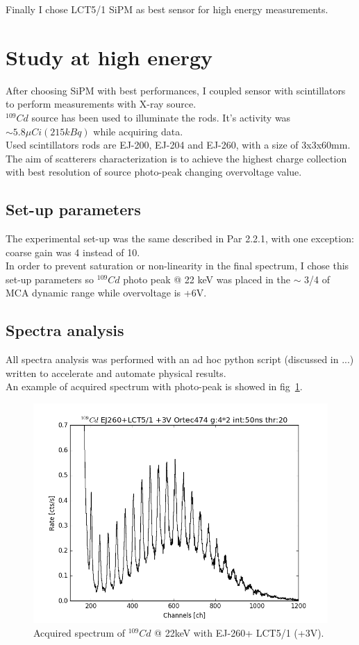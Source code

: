 \documentclass[10pt,a4paper, openany]{book}
\begin{document}
Finally I chose LCT5/1 SiPM as best sensor for high energy measurements.

\section{Study at high energy}
After choosing SiPM with best performances, I coupled sensor with scintillators to perform measurements with X-ray source.\\
$^{109}Cd$ source has been used to illuminate the rods. It's activity was $\sim 5.8 \mu Ci (215 kBq)$ while acquiring data.\\
Used scintillators rods are EJ-200, EJ-204 and EJ-260, with a size of 3x3x60mm.\\
The aim of scatterers characterization is to achieve the highest charge collection with best resolution of source photo-peak changing overvoltage value.

\subsection{Set-up parameters}
The experimental set-up was the same described in Par 2.2.1, with one exception: coarse gain was 4 instead of 10.\\
In order to prevent saturation or non-linearity in the final spectrum, I chose this set-up parameters so $^{109}Cd$ photo peak @ 22 keV was placed in the $\sim$ 3/4 of MCA dynamic range while overvoltage is +6V.
\subsection{Spectra analysis}
All spectra analysis was performed with an ad hoc python script (discussed in ...) written to accelerate and automate physical results.\\
An example of acquired spectrum with photo-peak is showed in fig~\ref{fig:es_spec}.

\begin{figure}[!h]
\begin{center}
\includegraphics[scale=0.5]{imm/es_spec.png}
\end{center}
\caption{Acquired spectrum of $^{109}Cd$ @ 22keV with EJ-260+ LCT5/1 (+3V).} 
\label{fig:es_spec}
\end{figure}
\end{document}
